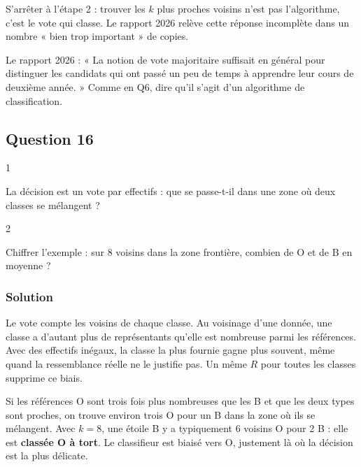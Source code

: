 \documentclass[11pt,a4paper]{article}
\begin{document}
\begin{piege}

S'arrêter à l'étape 2 : trouver les \(k\) plus proches voisins n'est pas l'algorithme, c'est le vote qui classe. Le rapport 2026 relève cette réponse incomplète dans un nombre « bien trop important » de copies.

\end{piege}

\begin{jury}

Le rapport 2026 : « La notion de vote majoritaire suffisait en général pour distinguer les candidats qui ont passé un peu de temps à apprendre leur cours de deuxième année. » Comme en Q6, dire qu'il s'agit d'un algorithme de classification.

\end{jury}

\hypertarget{question-16}{%
\subsection{Question 16}\label{question-16}}

\begin{indication}{1}

La décision est un vote par effectifs : que se passe-t-il dans une zone où deux classes se mélangent ?

\end{indication}

\begin{indication}{2}

Chiffrer l'exemple : sur \(8\) voisins dans la zone frontière, combien de O et de B en moyenne ?

\end{indication}

\hypertarget{solution-15}{%
\subsubsection{Solution}\label{solution-15}}

Le vote compte les voisins de chaque classe. Au voisinage d'une donnée, une classe a d'autant plus de représentants qu'elle est nombreuse parmi les références. Avec des effectifs inégaux, la classe la plus fournie gagne plus souvent, même quand la ressemblance réelle ne le justifie pas. Un même \(R\) pour toutes les classes supprime ce biais.

Si les références O sont trois fois plus nombreuses que les B et que les deux types sont proches, on trouve environ trois O pour un B dans la zone où ils se mélangent. Avec \(k = 8\), une étoile B y a typiquement 6 voisins O pour 2 B : elle est \textbf{classée O à tort}. Le classifieur est biaisé vers O, justement là où la décision est la plus délicate.
\end{document}
